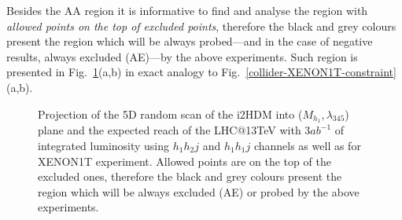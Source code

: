 \documentclass[12pt,a4paper]{article}
\begin{document}
Besides the AA region it is informative to find and analyse the region
with {\it allowed points on the top of excluded points}, therefore the
black and grey colours
present the region which will be always 
probed---and in the case of negative results, always excluded (AE)---by the above experiments. 
Such region is presented in Fig.~\ref{collider-XENON1T-constraint-AE}(a,b)
in exact analogy to  Fig.~\ref{collider-XENON1T-constraint}(a,b).
%
\begin{figure}[htb]
\vskip -0.5cm
%
\vskip -0.3cm
\caption{Projection of the 5D random scan of the i2HDM into ($M_{h_1},\lambda_{345}$)
plane and the expected  reach of the LHC@13TeV with 3$ab^{-1}$ of integrated luminosity 
using  $h_1 h_2 j$  and  $h_1 h_1 j$ channels as well as for XENON1T experiment.
Allowed points are on the top of the excluded ones, therefore
the black and grey colours
present  the region which will be always excluded (AE)
or probed by the above experiments.
\label{collider-XENON1T-constraint-AE}} 
\end{figure}
\end{document}
